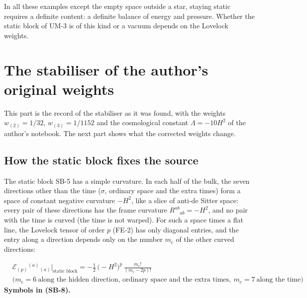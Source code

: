 \documentclass[
  10pt,
]{article}
\begin{document}
In all these examples except the empty space outside a star, staying
static requires a definite content: a definite balance of energy and
pressure. Whether the static block of UM-3 is of this kind or a vacuum
depends on the Lovelock weights.

\hypertarget{the-stabiliser-of-the-authors-original-weights}{%
\section{The stabiliser of the author's original
weights}\label{the-stabiliser-of-the-authors-original-weights}}

This part is the record of the stabiliser as it was found, with the
weights \(w_{(2)} = 1/32\), \(w_{(3)} = 1/1152\) and the cosmological
constant \(\Lambda = -10H^2\) of the author's notebook. The next part
shows what the corrected weights change.

\hypertarget{how-the-static-block-fixes-the-source}{%
\subsection{How the static block fixes the
source}\label{how-the-static-block-fixes-the-source}}

The static block SB-5 has a simple curvature. In each half of the bulk,
the seven directions other than the time (\(\sigma\), ordinary space and
the extra times) form a space of constant negative curvature \(-H^2\),
like a slice of anti-de Sitter space: every pair of these directions has
the frame curvature \(R^{ab}{}_{ab} = -H^2\), and no pair with the time
is curved (the time is not warped). For such a space times a flat line,
the Lovelock tensor of order \(p\) (FE-2) has only diagonal entries, and
the entry along a direction depends only on the number
\(m_{\mathrm{c}}\) of the other curved directions:

\[
\begin{aligned}
&\mathcal{E}_{(p)}{}^{(a)}{}_{(a)}\Big\vert_{\text{static block}} = -\frac12\,\big(-H^2\big)^p\,\frac{m_{\mathrm{c}}!}{(m_{\mathrm{c}} - 2p)!}\\
&\big(m_{\mathrm{c}} = 6\ \text{along the hidden direction, ordinary space and the extra times},\ m_{\mathrm{c}} = 7\ \text{along the time}\big)
\end{aligned} \tag{SB-8}
\] \textbf{Symbols in (SB-8).}
\end{document}
